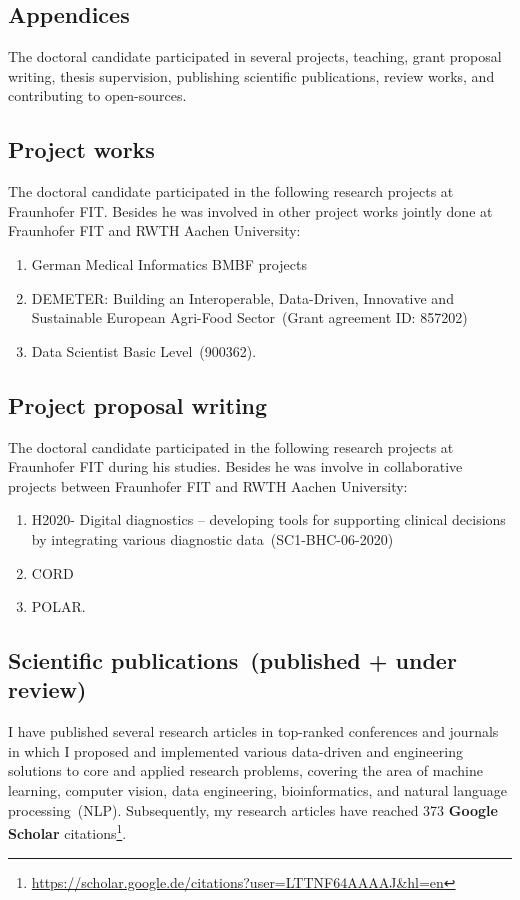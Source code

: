 \begin{appendices}
\section*{Appendices}
The doctoral candidate participated in several projects, teaching, grant proposal writing, thesis supervision, publishing scientific publications, review works, and contributing to open-sources. 

\subsection*{Project works}
The doctoral candidate participated in the following research projects at Fraunhofer FIT. Besides he was involved in other project works jointly done at Fraunhofer FIT and RWTH Aachen University:

\begin{enumerate}[noitemsep]
    \item German Medical Informatics BMBF projects
    \item DEMETER: Building an Interoperable, Data-Driven, Innovative and Sustainable European Agri-Food Sector~(Grant agreement ID: 857202)
    \item Data Scientist Basic Level~(900362). 
\end{enumerate}  

\subsection*{Project proposal writing}
The doctoral candidate participated in the following research projects at Fraunhofer FIT during his studies. Besides he was involve in collaborative projects between Fraunhofer FIT and RWTH Aachen University: 

\begin{enumerate}[noitemsep]
    \item H2020- Digital diagnostics – developing tools for supporting clinical decisions by integrating various diagnostic data~(SC1-BHC-06-2020)
    \item CORD
    \item POLAR.
\end{enumerate}  

\subsection*{Scientific publications~(published + under review)}
I have published several research articles in top-ranked conferences and journals in which I proposed and implemented various data-driven and engineering solutions to core and applied research problems, covering the area of machine learning, computer vision, data engineering, bioinformatics, and natural language processing~(NLP). Subsequently, my research articles have reached 373 \textbf{Google Scholar} citations\footnote{\url{https://scholar.google.de/citations?user=LTTNF64AAAAJ&hl=en}}. 


\end{appendices}
